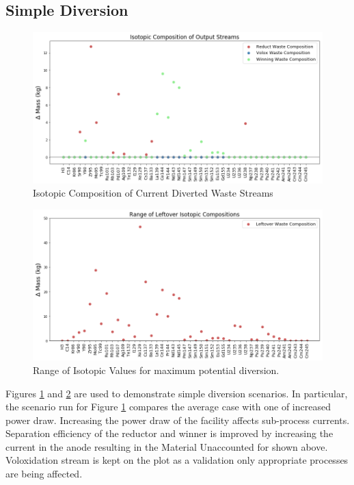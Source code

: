 \subsection{Simple Diversion}
\begin{figure} [h]
	\centering
	\includegraphics[width=\linewidth]{images/current-isotope-comp}
	\caption{Isotopic Composition of Current Diverted Waste Streams}
	\label{fig:current-isotope-comp}
\end{figure}

\begin{figure} [h]
	\centering
	\includegraphics[width=\linewidth]{images/isotopic-comp-range}
	\caption{Range of Isotopic Values for maximum potential diversion.}
	\label{fig:isotopic-range}
\end{figure}

Figures \ref{fig:current-isotope-comp} and \ref{fig:isotopic-range} are used to demonstrate simple diversion scenarios. In particular, the scenario run for Figure
\ref{fig:current-isotope-comp} compares the average case with one of increased power draw. Increasing the power draw of the facility affects sub-process currents.
Separation efficiency of the reductor and winner is improved by increasing the current in the anode resulting in the Material Unaccounted for shown above. Voloxidation stream
is kept on the plot as a validation only appropriate processes are being affected. 

